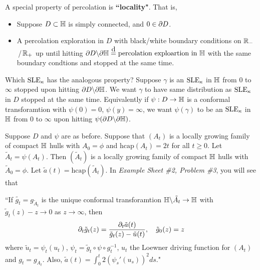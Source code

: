 \documentclass[12pt,a4paper]{article}
\newcommand\xeq{\stackrel{\mathclap{\normalfont\mbox{d}}}{=}}
\newenvironment{subproof}
{\begin{changemargin}{0.5cm}{0.5cm} 
	}%
	{\end{changemargin}
}
\renewenvironment{i}
{\begin{itemize} 
	}%
	{\end{itemize}
}
\begin{document}
\quad A special property of percolation is \textbf{``locality"}. That is,
\begin{i}
\item Suppose $D\subset \mathbb{H}$ is simply connected, and $0\in \partial D$.
\item A percolation exploration in $D$ with black/white boundary conditions on $\mathbb{R}_-$\,/\,$\mathbb{R}_+$ up until hitting $\pa D \backslash \pa \H \xeq \text{percolation exploartion in } \H$ with the same boundary condtions and stopped at the same time. 
\end{i}
\quad Which $\text{SLE}_{\kappa}$ has the analogous property? Suppose $\gamma$ is an $\text{SLE}_{\kappa}$ in $\mathbb{H}$ from $0$ to $\infty$ stopped upon hitting $\partial D \backslash \partial \mathbb{H}$. We want $\gamma$ to have same distribution as $\text{SLE}_{\kappa}$ in $D$ stopped at the same time. Equivalently if $\psi : D\rightarrow \mathbb{H}$ is a conformal transforamtion with $\psi(0)=0$, $\psi(y) = \infty$, we want $\psi(\gamma)$ to be an $\text{SLE}_{\kappa}$ in $\mathbb{H}$ from 0 to $\infty$ upon hitting $\psi(\partial D \backslash \partial \mathbb{H})$.

\quad Suppose $D$ and $\psi$ are as before. Suppose that $(A_t)$ is a locally growing family of compact $\mathbb{H}$ hulls with $A_0 = \phi$ and $\text{hcap}(A_t) =2t$ for all $t\geq 0$. Let $\tilde{A}_t = \psi(A_t)$. Then $(\tilde{A}_t)$ is a locally growing family of compact $\mathbb{H}$ hulls with $\tilde{A}_0 =\phi$. Let $\tilde{a}(t) = \text{hcap}(\tilde{A}_t)$. In \emph{Example Sheet \#2, Problem \#3}, you will see that
\begin{subproof}
``If $\tilde{g_t} = g_{\tilde{A}_t}$ is the unique conformal transforamtion $\mathbb{H} \backslash \tilde{A_t} \rightarrow \mathbb{H}$ with $\tilde{g}_t(z) -z \rightarrow 0$ as $z\rightarrow \infty$, then
\begin{align*}
\partial_t \tilde{g}_t (z) = \frac{\partial_t \tilde{a}(t)}{\tilde{g}_t(z) - \tilde{u}(t)}, \quad \tilde{g}_0(z) = z
\end{align*}
where $\tilde{u}_t = \psi_t(u_t)$, $\psi_t = \tilde{g}_t \circ \psi \circ g_t^{-1}$, $u_t$ the Loewner driving function for $(A_t)$ and $g_t = g_{A_t}$. Also, $\tilde{a}(t) = \int_0^t 2(\psi_s'(u_s))^2 ds$."
\end{subproof}
\s
\end{document}
